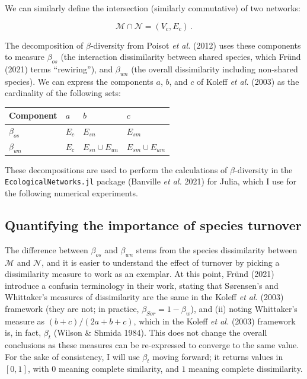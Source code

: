 \documentclass[10pt,oneside]{article}
\begin{document}
We can similarly define the intersection (similarly commutative) of two
networks:

\[\mathcal{M} \cap \mathcal{N} = (V_c, E_c)\,.\]

The decomposition of \(\beta\)-diversity from Poisot \emph{et al.}
(2012) uses these components to measure \(\beta_{os}\) (the interaction
dissimilarity between shared species, which Fründ (2021) terms
``rewiring''), and \(\beta_{wn}\) (the overall dissimilarity including
non-shared species). We can express the components \(a\), \(b\), and
\(c\) of Koleff \emph{et al.} (2003) as the cardinality of the following
sets:

\begin{longtable}[]{@{}llll@{}}
\toprule
Component & \(a\) & \(b\) & \(c\)\tabularnewline
\midrule
\endhead
\(\beta_{os}\) & \(E_c\) & \(E_{sn}\) & \(E_{sm}\)\tabularnewline
\(\beta_{wn}\) & \(E_c\) & \(E_{sn} \cup E_{un}\) &
\(E_{sm} \cup E_{um}\)\tabularnewline
\bottomrule
\end{longtable}

These decompositions are used to perform the calculations of
\(\beta\)-diversity in the \texttt{EcologicalNetworks.jl} package
(Banville \emph{et al.} 2021) for Julia, which I use for the following
numerical experiments.

\hypertarget{quantifying-the-importance-of-species-turnover}{%
\subsection{Quantifying the importance of species
turnover}\label{quantifying-the-importance-of-species-turnover}}

The difference between \(\beta_{os}\) and \(\beta_{wn}\) stems from the
species dissimilarity between \(\mathcal{M}\) and \(\mathcal{N}\), and
it is easier to understand the effect of turnover by picking a
dissimilarity measure to work as an exemplar. At this point, Fründ
(2021) introduce a confusin terminology in their work, stating that
S\o rensen's and Whittaker's measures of dissimilarity are the same in
the Koleff \emph{et al.} (2003) framework (they are not; in practice,
\(\beta_{Sor}=1-\beta_{w}\)), and (ii) noting Whittaker's measure as
\((b+c)/(2a+b+c)\), which in the Koleff \emph{et al.} (2003) framework
is, in fact, \(\beta_t\) (Wilson \& Shmida 1984). This does not change
the overall conclusions as these measures can be re-expressed to
converge to the same value. For the sake of consistency, I will use
\(\beta_t\) moving forward; it returns values in \([0,1]\), with \(0\)
meaning complete similarity, and \(1\) meaning complete dissimilarity.
\end{document}
